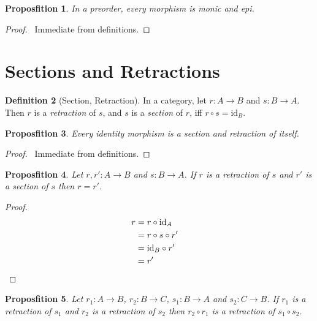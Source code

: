 \documentclass{book}
\let\qed\relax
\newtheorem{prop}{Proposfition}[chapter]
\theoremstyle{definition}
\newtheorem{df}[prop]{Definition}
\newcommand{\id}[1]{\ensuremath{\mathrm{id}_{#1}}}
\begin{document}
\begin{prop}
    In a preorder, every morphism is monic and epi.
\end{prop}

\begin{proof}
    \pf\ Immediate from definitions. \qed
\end{proof}

\section{Sections and Retractions}

\begin{df}[Section, Retraction]
    In a category, let $r : A \rightarrow B$ and $s : B \rightarrow A$. Then $r$ is a \emph{retraction} of $s$, and $s$ is a \emph{section} of $r$, iff $r \circ s = \id{B}$.
\end{df}

\begin{prop}
    Every identity morphism is a section and retraction of itself.
\end{prop}

\begin{proof}
    \pf\ Immediate from definitions. \qed
\end{proof}

\begin{prop}
    \label{prop:retraction-is-section}
    Let $r,r' : A \rightarrow B$ and $s : B \rightarrow A$.
    If $r$ is a retraction of $s$ and $r'$ is a section of $s$ then $r = r'$.
\end{prop}

\begin{proof}
    \pf
    \begin{align*}
        r & = r \circ \id{A}            \\
          & = r \circ s \circ r'        \\
          & = \id{B} \circ r'           \\
          & = r'                 & \qed
    \end{align*}
\end{proof}

\begin{prop}
    \label{prop:retraction-comp}
    Let $r_1 : A \rightarrow B$, $r_2 : B \rightarrow C$, $s_1 : B \rightarrow A$ and $s_2 : C \rightarrow B$. If $r_1$ is a retraction of $s_1$ and $r_2$ is a retraction of $s_2$ then $r_2 \circ r_1$ is a retraction of $s_1 \circ s_2$.
\end{prop}
\end{document}
